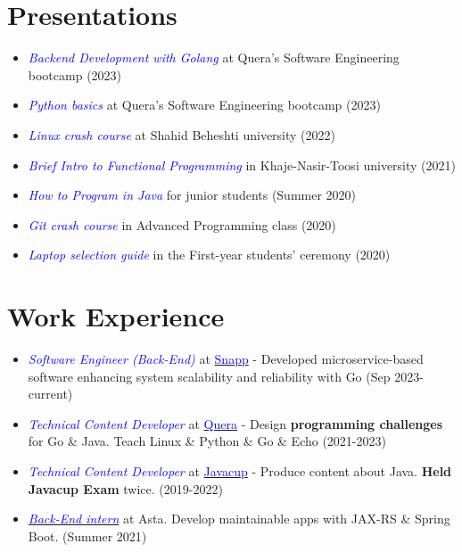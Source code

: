 \documentclass[11pt,a4paper,sans]{moderncv}
\begin{document}

\pagebreak
\section{Presentations}
\begin{itemize}
\item \textit{\textcolor{blue}{Backend Development with Golang}} at Quera's Software Engineering bootcamp (2023)
\item \textit{\textcolor{blue}{Python basics}} at Quera's Software Engineering bootcamp (2023)
\item \textit{\textcolor{blue}{Linux crash course}} at Shahid Beheshti university (2022)
\item \textit{\textcolor{blue}{Brief Intro to Functional Programming}} in Khaje-Nasir-Toosi university (2021)
\item \textit{\textcolor{blue}{How to Program in Java}} for junior students (Summer 2020)
\item \textit{\textcolor{blue}{Git crash course}} in Advanced Programming class  (2020)
\item \textit{\textcolor{blue}{Laptop selection guide}} in the First-year students' ceremony (2020)
\end{itemize}



\vspace{-0.4em}
\section{Work Experience}
\begin{itemize}

\item \textit{\textcolor{blue}{Software Engineer (Back-End)}} at \href{https://snapp.ir/about}{\textcolor{blue}{Snapp}} -
    Developed microservice-based software enhancing system scalability and reliability  with Go (Sep 2023-current)

\item \textit{\textcolor{blue}{Technical Content Developer}} at \href{https://quera.org}{\textcolor{blue}{Quera}} - Design \textbf{programming challenges} for Go \& Java. Teach Linux \& Python \& Go \& Echo (2021-2023)

\item \textit{\textcolor{blue}{Technical Content Developer}} at {\href{https://javacup.ir}{\textcolor{blue}{Javacup}}} - Produce content about Java. \textbf{Held Javacup Exam} twice. (2019-2022)

\item \textit{{\href{https://asta.ir}{\textcolor{blue}{Back-End intern}}}} at Asta. Develop maintainable apps with JAX-RS \& Spring Boot. (Summer 2021)
\end{itemize}
\end{document}
